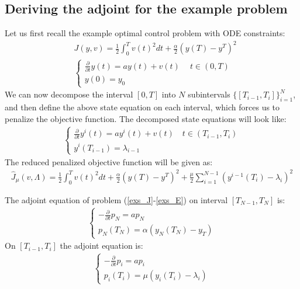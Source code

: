 \subsection{Deriving the adjoint for the example problem}
Let us first recall the example optimal control problem with ODE constraints:
\begin{align*}
&J(y,v) = \frac{1}{2}\int_0^Tv(t)^2dt + \frac{\alpha}{2}(y(T)-y^T)^2 \\
&\left\{
     \begin{array}{lr}
       	\frac{\partial}{\partial t}y(t)=a y(t) + v(t) \ \quad t\in(0,T)\\
       	y(0)=y_0
     \end{array}
   \right.
\end{align*}
We can now decompose the interval $[0,T]$ into $N$ subintervals $\{[T_{i-1},T_{i}]\}_{i=1}^{N}$, and then define the above state equation on each interval, which forces us to penalize the objective function. The decomposed state equations will look like:
\begin{align}
\left\{
     \begin{array}{lr}
       	\frac{\partial}{\partial t} y^i(t)=a y^i(t) + v(t) \quad t\in(T_{i-1},T_{i})\\
       	y^i(T_{i-1})=\lambda_{i-1}
     \end{array}
   \right. \label{decomp_E}
\end{align}
The reduced penalized objective function will be given as:
\begin{align}
\hat J_{\mu}(v,\Lambda) = \frac{1}{2}\int_0^Tv(t)^2dt + \frac{\alpha}{2}(y(T)-y^T)^2 + \frac{\mu}{2}\sum_{i=1}^{N-1}(y^{i-1}(T_i)-\lambda_i)^2 \label{penalty_func}
\end{align}
\begin{theorem}
The adjoint equation of problem (\ref{exs_J}-\ref{exs_E}) on interval $[T_{N-1},T_N]$ is:
\begin{align}
\left\{
     \begin{array}{lr}
	-\frac{\partial }{\partial t}p_N =a p_N  \\
	p_N(T_{N}) = \alpha( y_N(T_{N})-y_T)
	\end{array}
   \right. \label{end adjoint}
\end{align}
On $[T_{i-1},T_i]$ the adjoint equation is:
\begin{align}
\left\{
     \begin{array}{lr}
	-\frac{\partial }{\partial t}p_i =ap_i  \\
	p_i(T_{i}) = \mu(y_{i}(T_{i})-\lambda_{i} )
	\end{array}
   \right. \label{exs_adjoint}
\end{align}
\end{theorem} 
